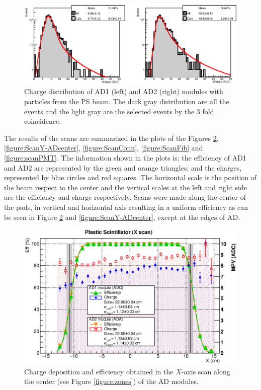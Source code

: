 	\begin{figure}[h!]
	  	\begin{center}
	  		\includegraphics[scale=0.75]{./images/scan/Q_beamTest_3226.eps}
	  		\caption{
	Charge distribution of AD1 (left) and AD2 (right) modules with particles from the PS beam. %
				The dark gray distribution are all the events and
				the light gray are the selected events by the 3 fold coincidence.
	  		}
	  		\label{figure:Charge_distribution}
	  	\end{center}
	\end{figure}
	The results of the scans are summarized in the plots of the Figures \ref{figure:ScanX-ADcenter}, \ref{figure:ScanY-ADcenter},
	\ref{figure:ScanConn}, \ref{figure:ScanFib} and \ref{figure:scanPMT}. 
	The information shown in the plots is: the efficiency of AD1 and AD2 are 
	represented by the green and orange triangles; 
	and the charges, represented by blue circles and red squares. %
	The horizontal scale is the position 
	of the beam respect to the center and the vertical scales at the left and right side are the efficiency and 
	charge respectively.
	Scans were made along the center of the pads, in vertical and horizontal axis resulting in a uniform
	efficiency as can be seen in Figure \ref{figure:ScanX-ADcenter} and \ref{figure:ScanY-ADcenter}, except at the 
	edges of AD. 
	
	\begin{figure}[hb!]%
		\begin{center}
			\includegraphics[scale=0.5]{./images/scan/Xaxis_scan.eps}
			\caption{
			Charge deposition and efficiency obtained in the $X$-axis scan along the center (see Figure \ref{figure:zones}) of the AD modules. 
			}
			\label{figure:ScanX-ADcenter}
		\end{center}
	\end{figure}
	

